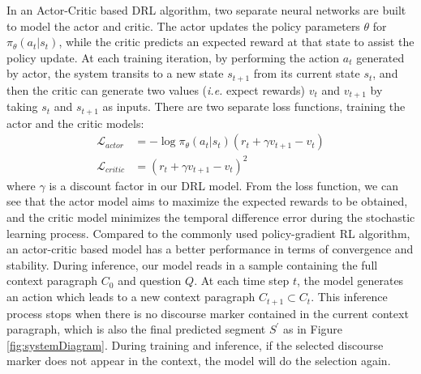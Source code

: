 In an Actor-Critic based DRL algorithm, two separate neural networks are built to model the actor and critic. The actor updates the policy parameters $\theta$ for $\pi_\theta(a_t|s_t)$, while the critic predicts an expected reward at that state to assist the policy update. %
At each training iteration, by performing the action $a_t$ generated by actor, the system transits to a new state $s_{t+1}$ from its current state $s_t$, and then the critic  can generate two values (\emph{i.e.} expect rewards) $v_t$ and $v_{t+1}$ by taking $s_t$ and $s_{t+1}$ as inputs. There are two separate loss functions, training the actor and the critic models:
\begin{equation}
\begin{split}
\mathcal{L}_{actor}&=-\log \pi_{\theta} (a_t|s_t)(r_t+\gamma v_{t+1}-v_{t})\\
\mathcal{L}_{critic}&=(r_t+\gamma v_{t+1}-v_{t})^2
\label{rlloss}
\end{split}
\end{equation}
where $\gamma$ is a discount factor in our DRL model. From the loss function, we can see that the actor model aims to maximize the expected rewards to be obtained, and the critic model minimizes the temporal difference error during the stochastic learning process. Compared to the commonly used policy-gradient RL algorithm, an actor-critic based model has a better performance in terms of convergence and stability. During inference, our model reads in a sample containing the full context paragraph $C_0$ and question $Q$. At each time step $t$, the model generates an action which leads to a new context paragraph $C_{t+1}\subset C_t$. This inference process stops when there is no discourse marker contained in the current context paragraph, which is also the final predicted segment $S^{\prime}$ as in Figure \ref{fig:systemDiagram}. During training and inference, if the selected discourse marker does not appear in the context, the model will do the selection again.

